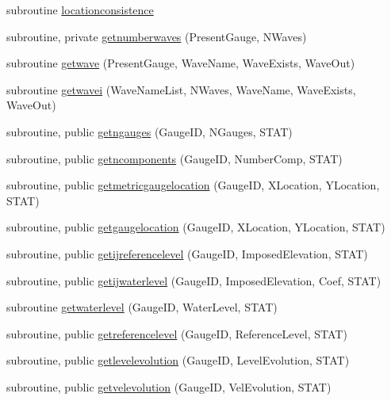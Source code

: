 \begin{DoxyCompactItemize}
\item 
subroutine \mbox{\hyperlink{namespacemodulegauge_a3c28cc048b2b01fde65fb7a5fc9f7213}{locationconsistence}}
\item 
subroutine, private \mbox{\hyperlink{namespacemodulegauge_a3e3b74ba912595c577820445ad14cb64}{getnumberwaves}} (Present\+Gauge, N\+Waves)
\item 
subroutine \mbox{\hyperlink{namespacemodulegauge_a0e2dffbc5ada081dc537e80f461ae0eb}{getwave}} (Present\+Gauge, Wave\+Name, Wave\+Exists, Wave\+Out)
\item 
subroutine \mbox{\hyperlink{namespacemodulegauge_af6c96743755f8c096eb5335e0993e175}{getwavei}} (Wave\+Name\+List, N\+Waves, Wave\+Name, Wave\+Exists, Wave\+Out)
\item 
subroutine, public \mbox{\hyperlink{namespacemodulegauge_a7a4e1ac4c0d2468bf869594a8677a7d0}{getngauges}} (Gauge\+ID, N\+Gauges, S\+T\+AT)
\item 
subroutine, public \mbox{\hyperlink{namespacemodulegauge_adc2b7e3c857dc1649430eaa5a0fb1882}{getncomponents}} (Gauge\+ID, Number\+Comp, S\+T\+AT)
\item 
subroutine, public \mbox{\hyperlink{namespacemodulegauge_af98cce9ae7ea92a6068724894d803842}{getmetricgaugelocation}} (Gauge\+ID, X\+Location, Y\+Location, S\+T\+AT)
\item 
subroutine, public \mbox{\hyperlink{namespacemodulegauge_a118b41963f151494a832cd94010c6282}{getgaugelocation}} (Gauge\+ID, X\+Location, Y\+Location, S\+T\+AT)
\item 
subroutine, public \mbox{\hyperlink{namespacemodulegauge_a9b801d4a79f8bfd52e8276c2b5525b5e}{getijreferencelevel}} (Gauge\+ID, Imposed\+Elevation, S\+T\+AT)
\item 
subroutine, public \mbox{\hyperlink{namespacemodulegauge_aa7b1b101cf558db427ad03b4a0e72f09}{getijwaterlevel}} (Gauge\+ID, Imposed\+Elevation, Coef, S\+T\+AT)
\item 
subroutine \mbox{\hyperlink{namespacemodulegauge_a0201de248a96f786a6ac1e9875435ba3}{getwaterlevel}} (Gauge\+ID, Water\+Level, S\+T\+AT)
\item 
subroutine, public \mbox{\hyperlink{namespacemodulegauge_a3f8df5ad4b3209ed0c1f3dda8945093f}{getreferencelevel}} (Gauge\+ID, Reference\+Level, S\+T\+AT)
\item 
subroutine, public \mbox{\hyperlink{namespacemodulegauge_aeb445b9f9d227121a220ceafb472ec2c}{getlevelevolution}} (Gauge\+ID, Level\+Evolution, S\+T\+AT)
\item 
subroutine, public \mbox{\hyperlink{namespacemodulegauge_af4997d45043f601c961fd7d153c0b413}{getvelevolution}} (Gauge\+ID, Vel\+Evolution, S\+T\+AT)

\end{DoxyCompactItemize}
